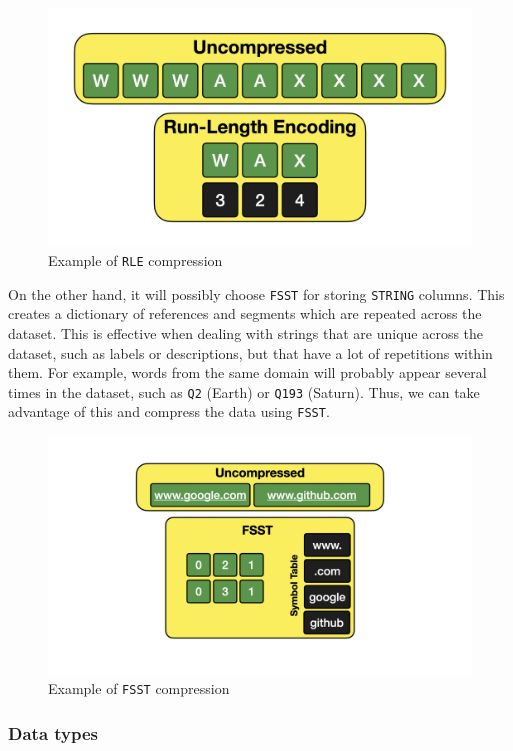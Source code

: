 \begin{figure}[ht]
    \centering
    \includegraphics[width=.8\linewidth]{figures/diagrams/10-2_rle.png}
    \caption[Example of \texttt{RLE} compression]{Example of \texttt{RLE} compression \cite{Raasveldt_2022}}
\end{figure}

On the other hand, it will possibly choose \texttt{FSST} for storing \texttt{STRING} columns. This creates a dictionary of references and segments which are repeated across the dataset. This is effective when dealing with strings that are unique across the dataset, such as labels or descriptions, but that have a lot of repetitions within them. For example, words from the same domain will probably appear several times in the dataset, such as \texttt{Q2} (Earth) or \texttt{Q193} (Saturn). Thus, we can take advantage of this and compress the data using \texttt{FSST}.

\begin{figure}[ht]
    \centering
    \includegraphics[width=.8\linewidth]{figures/diagrams/10-3_fsst.png}
    \caption[Example of \texttt{FSST} compression]{Example of \texttt{FSST} compression \cite{Raasveldt_2022}}
\end{figure}

\subsubsection{Data types}

